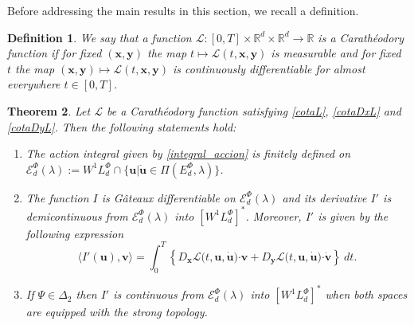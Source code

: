 \documentclass[twoside]{article}
\newtheorem{thm}{Theorem}[section]
\newtheorem{defi}[thm]{Definition}
\theoremstyle{remark}
\newcommand{\lphi}{L^{\Phi}}
\newcommand{\ephi}{E^{\Phi}}
\newcommand{\wphi}{W^{1}\lphi}
\newcommand{\domi}{\mathcal{E}^{\Phi}_d(\lambda)}
\renewcommand{\b}[1]{\boldsymbol{#1}}
\newcommand{\ccdot}{\b{\cdot}}
\begin{document}
 Before addressing the main results in this section, we recall a definition.  


\begin{defi} We say that a function $\mathcal{L}:[0,T]\times \mathbb{R}^d \times \mathbb{R}^d \rightarrow \mathbb{R}$ is a Carath\'eodory function if for fixed $(\b{x},\b{y})$
the map $t \mapsto \mathcal{L}(t, \b{x},\b{y})$ is measurable  and for fixed $t$ the map  $(\b{x},\b{y}) \mapsto \mathcal{L}(t, \b{x}, \b{y})$ is continuously differentiable for almost everywhere $t\in [0,T]$.

\end{defi}



\begin{thm}\label{teorema_acotacion}
Let $\mathcal{L}$ be a Carath\'eodory function satisfying \eqref{cotaL}, \eqref{cotaDxL} and \eqref{cotaDyL}. 
Then the following statements hold:
\begin{enumerate}
\item \label{T1item1} \label{A1} The action integral given by \eqref{integral_accion}
is finitely defined on $\domi:=W^{1}\lphi_d\cap\{\b{u}|\b{\dot{u}}\in\Pi(\ephi_d,\lambda)\}$.

\item\label{T1item3} The function  $I$ is G\^ateaux differentiable on $\domi$ and  its derivative $I'$ is demicontinuous from $\domi$  into $\left[\wphi_d \right]^*$. Moreover, $I'$ is given by the following expression
\begin{equation}\label{DerAccion}
\langle  I'(\b{u}),\b{v}\rangle= \int_0^T \left\{D_{\b{x}}\mathcal{L}\big(t,\b{u},\b{\dot{u}}\big)\ccdot \b{v}+ D_{\b{y}}\mathcal{L}\big(t,\b{u},\b{\dot{u}}\big)\ccdot\b{\dot{v}}\right\} \ dt.
\end{equation}

\item\label{T1item4}  If  $\Psi \in \Delta_2$ then 
  $I'$ is continuous from $\domi$ into $\left[\wphi_d\right]^*$ when both spaces are equipped with the strong topology.


\end{enumerate}
\end{thm}
\end{document}
